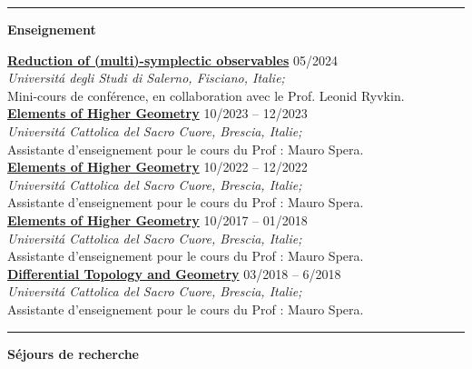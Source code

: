 \documentclass[a4paper]{article}
\newcommand{\block}[1]{\hrule \vspace{0.2cm} \textbf{\Large #1} \vspace{0.2cm}}
\newcommand{\voice}[5]{\href{#4}{\textbf{#1}} \hfill #2 \\ \textit{#3} \\ {\small #5} \vspace{0.2cm} \\}
\begin{document}
    \block{Enseignement}

    
    \voice{Reduction of (multi)-symplectic observables}
        {05/2024}
        {Universit\'a degli Studi di Salerno, Fisciano, Italie;}
        {https://www.antoniomiti.it/teaching/Obs-Constraint-2024/}       
        {Mini-cours de conférence, en collaboration avec le Prof. Leonid Ryvkin.}
    \voice{Elements of Higher Geometry}
        {10/2023 -- 12/2023}
        {Universit\'a Cattolica del Sacro Cuore, Brescia, Italie;}
        {https://dmf.unicatt.it/miti/teaching/IstGeoSup-22-23/}       
        {Assistante d'enseignement pour le cours du Prof : Mauro Spera.}
    \voice{Elements of Higher Geometry}
        {10/2022 -- 12/2022}
        {Universit\'a Cattolica del Sacro Cuore, Brescia, Italie;}
        {https://dmf.unicatt.it/miti/teaching/IstGeoSup-22-23/}       
        {Assistante d'enseignement pour le cours du Prof : Mauro Spera.}
    \voice{Elements of Higher Geometry}
        {10/2017 -- 01/2018}
        {Universit\'a Cattolica del Sacro Cuore, Brescia, Italie;}
        {http://docenti.unicatt.it/web/html/index.html\#/programmi/BS/2D9B/75017/2017/21065/MIH341/ita}       
        {Assistante d'enseignement pour le cours du Prof : Mauro Spera.}
    \voice{Differential Topology and Geometry}
        {03/2018 -- 6/2018}
        {Universit\'a Cattolica del Sacro Cuore, Brescia, Italie;}
        {http://docenti.unicatt.it/web/html/index.html\#/programmi/BS/2D8B/75017/2017/21065/MGH344/ita}       
        {Assistante d'enseignement pour le cours du Prof : Mauro Spera.}

        










    \block{Séjours de recherche}
\end{document}
